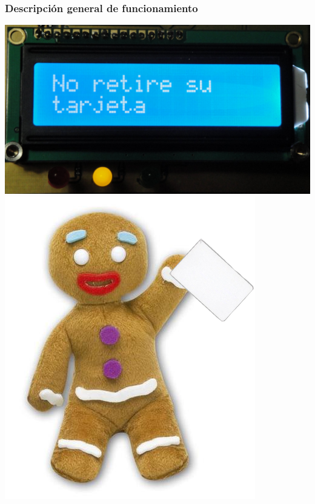 \documentclass{beamer}
\begin{document}
\begin{frame}
	\frametitle{Descripción general de funcionamiento}
	\begin{center}
		\includegraphics[scale=.08]{Imagenes/noretire.jpg}
		\includegraphics[scale=.35]{Imagenes/pinpon_tarj.png}
	\end{center}
\end{frame}	
\end{document}
